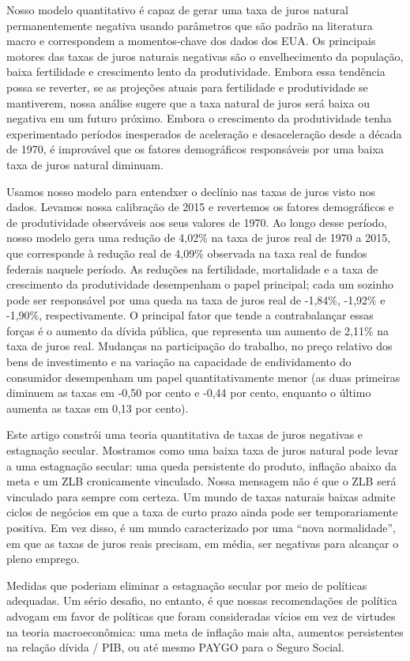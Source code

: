 Nosso modelo quantitativo é capaz de gerar uma taxa de juros natural permanentemente negativa usando parâmetros que são padrão na literatura macro e correspondem a momentos-chave dos dados dos EUA. Os principais motores das taxas de juros naturais negativas são o envelhecimento da população, baixa fertilidade e crescimento lento da produtividade. Embora essa tendência possa se reverter, se as projeções atuais para fertilidade e produtividade se mantiverem, nossa análise sugere que a taxa natural de juros será baixa ou negativa em um futuro próximo. Embora o crescimento da produtividade tenha experimentado períodos inesperados de aceleração e desaceleração desde a década de 1970, é improvável que os fatores demográficos responsáveis por uma baixa taxa de juros natural diminuam.

Usamos nosso modelo para entendxer o declínio nas taxas de juros visto nos dados. Levamos nossa calibração de 2015 e revertemos os fatores demográficos e de produtividade observáveis aos seus valores de 1970. Ao longo desse período, nosso modelo gera uma redução de 4,02\% na taxa de juros real de 1970 a 2015, que corresponde à redução real de 4,09\% observada na taxa real de fundos federais naquele período. As reduções na fertilidade, mortalidade e a taxa de crescimento da produtividade desempenham o papel principal; cada um sozinho pode ser responsável por uma queda na taxa de juros real de -1,84\%, -1,92\% e -1,90\%, respectivamente. O principal fator que tende a contrabalançar essas forças é o aumento da dívida pública, que representa um aumento de 2,11\% na taxa de juros real. Mudanças na participação do trabalho, no preço relativo dos bens de investimento e na variação na capacidade de endividamento do consumidor desempenham um papel quantitativamente menor (as duas primeiras diminuem as taxas em -0,50 por cento e -0,44 por cento, enquanto o último aumenta as taxas em 0,13 por cento).

Este artigo constrói uma teoria quantitativa de taxas de juros negativas e estagnação secular. Mostramos como uma baixa taxa de juros natural pode levar a uma estagnação secular: uma queda persistente do produto, inflação abaixo da meta e um ZLB cronicamente vinculado. Nossa mensagem não é que o ZLB será vinculado para sempre com certeza. Um mundo de taxas naturais baixas admite ciclos de negócios em que a taxa de curto prazo ainda pode ser temporariamente positiva. Em vez disso, é um mundo caracterizado por uma “nova normalidade”, em que as taxas de juros reais precisam, em média, ser negativas para alcançar o pleno emprego.

Medidas que poderiam eliminar a estagnação secular por meio de políticas adequadas. Um sério desafio, no entanto, é que nossas recomendações de política advogam em favor de políticas que foram consideradas vícios em vez de virtudes na teoria macroeconômica: uma meta de inflação mais alta, aumentos persistentes na relação dívida / PIB, ou até mesmo PAYGO  para o Seguro Social.